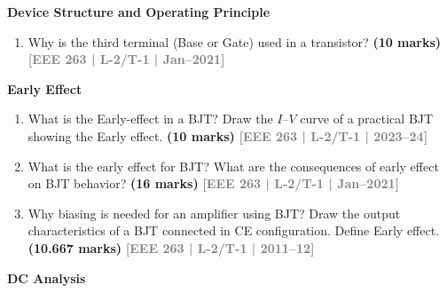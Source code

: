 \documentclass[12pt,a3paper]{article}
\newcommand{\yr}[1]{\hfill\textcolor{gray}{\small\textbf{[#1]}}}
\newcommand{\mk}[1]{\textcolor{orange!70!black}{\small\textbf{(#1 marks)}}}
\newcommand{\subtopic}[2]{%
  \vspace{10pt}
  \noindent\begin{tcolorbox}[colback=#1!8,colframe=#1,boxrule=0.6pt,arc=4pt,
    left=6pt,right=6pt,top=4pt,bottom=4pt]
    \small\bfseries\textcolor{#1}{#2}
  \end{tcolorbox}
  \vspace{2pt}
}
\begin{document}
\subtopic{cA}{Device Structure and Operating Principle}
\label{sub:s2-structure}

\begin{enumerate}\item Why is the third terminal (Base or Gate) used in a transistor?
\mk{10} \yr{EEE 263 | L-2/T-1 | Jan--2021}

\end{enumerate}

\subtopic{cA}{Early Effect}
\label{sub:s2-early}

\begin{enumerate}\item What is the Early-effect in a BJT? Draw the $I$--$V$ curve of a practical BJT showing the Early effect.
\mk{10} \yr{EEE 263 | L-2/T-1 | 2023--24}

\item What is the early effect for BJT? What are the consequences of early effect on BJT behavior?
\mk{16} \yr{EEE 263 | L-2/T-1 | Jan--2021}

\item Why biasing is needed for an amplifier using BJT? Draw the output characteristics of a BJT connected in CE configuration. Define Early effect.
\mk{10.667} \yr{EEE 263 | L-2/T-1 | 2011--12}

\end{enumerate}

\subtopic{cA}{DC Analysis}
\label{sub:s2-dc}
\end{document}
